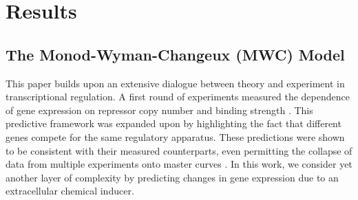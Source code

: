 \section*{Results}
\subsection*{The Monod-Wyman-Changeux (MWC) Model}
%
This paper builds upon an extensive dialogue between theory and experiment in
transcriptional regulation. A first round of experiments measured the
dependence of gene expression on repressor copy number and binding strength
\cite{Garcia2011}. This predictive framework was expanded upon by highlighting the fact that different genes compete for the
same regulatory apparatus. These predictions were shown to be
consistent with their measured counterparts, even permitting the collapse of
data from multiple experiments onto master curves \cite{Brewster2014,
Weinert2014}. In this work, we consider yet another layer of complexity
by predicting changes in gene expression due to an extracellular chemical
inducer.

